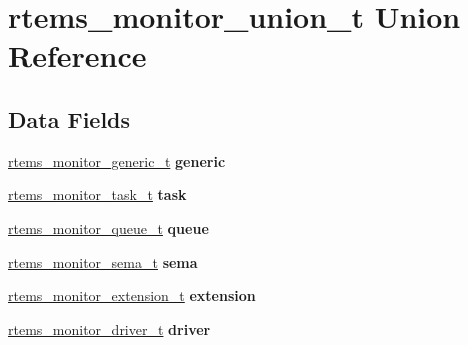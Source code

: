 \hypertarget{unionrtems__monitor__union__t}{}\section{rtems\+\_\+monitor\+\_\+union\+\_\+t Union Reference}
\label{unionrtems__monitor__union__t}
\subsection*{Data Fields}
\begin{DoxyCompactItemize}
\item 
\mbox{\label{unionrtems__monitor__union__t_af1f7d864e8b32b9035f2474b020bc27e}} 
\mbox{\hyperlink{structrtems__monitor__generic__t}{rtems\+\_\+monitor\+\_\+generic\+\_\+t}} {\bfseries generic}
\item 
\mbox{\label{unionrtems__monitor__union__t_a4a93ba0a17ffb16c143be2799dfceb01}} 
\mbox{\hyperlink{structrtems__monitor__task__t}{rtems\+\_\+monitor\+\_\+task\+\_\+t}} {\bfseries task}
\item 
\mbox{\label{unionrtems__monitor__union__t_ab5322ed3b3a7b959ca7152b72a615310}} 
\mbox{\hyperlink{structrtems__monitor__queue__t}{rtems\+\_\+monitor\+\_\+queue\+\_\+t}} {\bfseries queue}
\item 
\mbox{\label{unionrtems__monitor__union__t_a925451c1d43bff6fa6962a162910907e}} 
\mbox{\hyperlink{structrtems__monitor__sema__t}{rtems\+\_\+monitor\+\_\+sema\+\_\+t}} {\bfseries sema}
\item 
\mbox{\label{unionrtems__monitor__union__t_a5af7c1910a0fdba599259979183c0776}} 
\mbox{\hyperlink{structrtems__monitor__extension__t}{rtems\+\_\+monitor\+\_\+extension\+\_\+t}} {\bfseries extension}
\item 
\mbox{\label{unionrtems__monitor__union__t_aadf2125944ec60cdff946762c56942b7}} 
\mbox{\hyperlink{structrtems__monitor__driver__t}{rtems\+\_\+monitor\+\_\+driver\+\_\+t}} {\bfseries driver}
\item 
\mbox{\label{unionrtems__monitor__union__t_a6196662d397cc1f7365372f692c906f8}} 

\end{DoxyCompactItemize}
